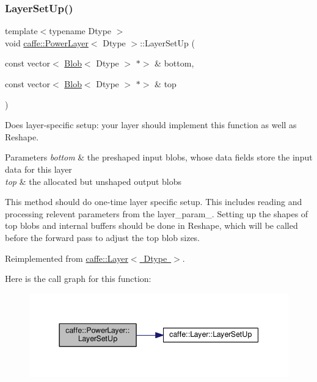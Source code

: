 \subsubsection{\texorpdfstring{Layer\+Set\+Up()}{LayerSetUp()}\hspace{0.1cm}{\footnotesize\ttfamily [1/2]}}
{\footnotesize\ttfamily template$<$typename Dtype $>$ \\
void \mbox{\hyperlink{classcaffe_1_1_power_layer}{caffe\+::\+Power\+Layer}}$<$ Dtype $>$\+::Layer\+Set\+Up (\begin{DoxyParamCaption}\item[{const vector$<$ \mbox{\hyperlink{classcaffe_1_1_blob}{Blob}}$<$ Dtype $>$ $\ast$$>$ \&}]{bottom,  }\item[{const vector$<$ \mbox{\hyperlink{classcaffe_1_1_blob}{Blob}}$<$ Dtype $>$ $\ast$$>$ \&}]{top }\end{DoxyParamCaption})\hspace{0.3cm}{\ttfamily [virtual]}}



Does layer-\/specific setup\+: your layer should implement this function as well as Reshape. 


\begin{DoxyParams}{Parameters}
{\em bottom} & the preshaped input blobs, whose data fields store the input data for this layer \\
\hline
{\em top} & the allocated but unshaped output blobs\\
\hline
\end{DoxyParams}
This method should do one-\/time layer specific setup. This includes reading and processing relevent parameters from the {\ttfamily layer\+\_\+param\+\_\+}. Setting up the shapes of top blobs and internal buffers should be done in {\ttfamily Reshape}, which will be called before the forward pass to adjust the top blob sizes. 

Reimplemented from \mbox{\hyperlink{classcaffe_1_1_layer_a481323a3e0972c682787f2137468c29f}{caffe\+::\+Layer$<$ Dtype $>$}}.

Here is the call graph for this function\+:
\nopagebreak
\begin{figure}[H]
\begin{center}
\leavevmode
\includegraphics[width=344pt]{classcaffe_1_1_power_layer_a954ad3da9a5fd54665de1181b6165796_cgraph}
\end{center}
\end{figure}
\mbox{\label{classcaffe_1_1_power_layer_a0adeb5a6bdf1e5e437eaae801236fecc}} 

